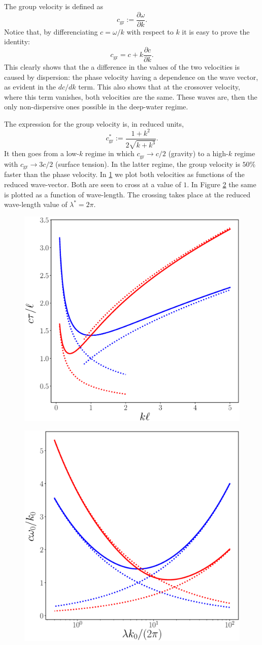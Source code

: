The group velocity is defined as
\[
  c_\mathrm{gr} := \frac{\partial \omega }{\partial k}  .
\]
Notice that, by differenciating $c = \omega / k$ with respect to $k$
it is easy to prove the identity:
\[
  c_\mathrm{gr} =  c + k \frac{\partial c }{\partial k}  .
\]
This clearly shows that the a difference in the values of the two
velocities is caused by dispersion: the phase velocity having a
dependence on the wave vector, as evident in the $dc/dk$ term. This
also shows that at the crossover velocity, where this term vanishes,
both velocities are the same. These waves are, then the only
non-dispersive ones possible in the deep-water regime.

The expression for the group velocity is, in reduced units,
\[
  c^*_\mathrm{gr} :=  \frac{1+ k ^2}{2\sqrt{k + k^3} } .
\]
It then goes from a low-$k$ regime in which $c_\mathrm{gr} \to c /2 $
(gravity) to a high-$k$ regime with $ c_\mathrm{gr} \to 3 c /2 $
(surface tension). In the latter regime, the group velocity is $50\%$
faster than the phase velocity.  In
\ref{fig:gravity_capillary_dispersion_k} we plot both velocities as
functions of the reduced wave-vector. Both are seen to cross at a
value of $1$.  In Figure \ref{fig:gravity_capillary_dispersion_lambda}
the same is plotted as a function of wave-length. The crossing takes
place at the reduced wave-length value of $\lambda^*=2\pi$.

\begin{figure}
  \centering
  \includegraphics[width=0.4\linewidth]{figures/gravity_capillary_dispersion_k}
  \caption{\label{fig:gravity_capillary_dispersion_k}}
\end{figure}


\begin{figure}
  \centering
  \includegraphics[width=0.4\linewidth]{figures/gravity_capillary_dispersion_lambda}
  \caption{\label{fig:gravity_capillary_dispersion_lambda}}
\end{figure}

